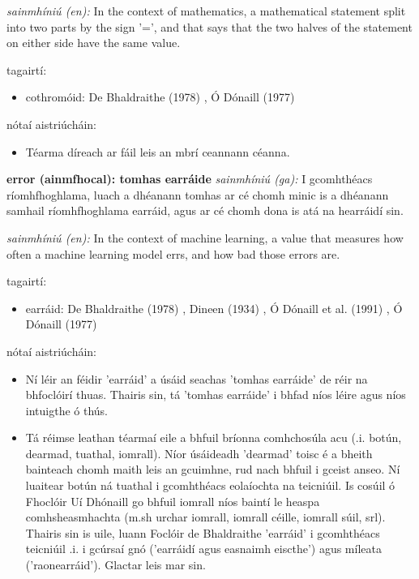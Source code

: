 \documentclass{article}
\begin{document}
\textit{sainmhíniú (en):} In the context of mathematics, a mathematical statement split into two parts by the sign '=', and that says that the two halves of the statement on either side have the same value.

tagairtí:
\begin{itemize}
	\item cothromóid: De Bhaldraithe (1978) \cite{de-bhaldraithe}, Ó Dónaill (1977) \cite{odonaill}
\end{itemize}

nótaí aistriúcháin:
\begin{itemize}
	\item Téarma díreach ar fáil leis an mbrí ceannann céanna.
\end{itemize}


\textbf{error (ainmfhocal): tomhas earráide}
\textit{sainmhíniú (ga):} I gcomhthéacs ríomhfhoghlama, luach a dhéanann tomhas ar cé chomh minic is a dhéanann samhail ríomhfhoghlama earráid, agus ar cé chomh dona is atá na hearráidí sin.

\textit{sainmhíniú (en):} In the context of machine learning, a value that measures how often a machine learning model errs, and how bad those errors are.

tagairtí:
\begin{itemize}
	\item earráid: De Bhaldraithe (1978) \cite{de-bhaldraithe}, Dineen (1934) \cite{dineen}, Ó Dónaill et al. (1991) \cite{focloir-beag}, Ó Dónaill (1977) \cite{odonaill}
\end{itemize}

nótaí aistriúcháin:
\begin{itemize}
	\item Ní léir an féidir 'earráid' a úsáid seachas 'tomhas earráide' de réir na bhfoclóirí thuas. Thairis sin, tá 'tomhas earráide' i bhfad níos léire agus níos intuigthe ó thús.
	\item Tá réimse leathan téarmaí eile a bhfuil bríonna comhchosúla acu (.i. botún, dearmad, tuathal, iomrall). Níor úsáideadh 'dearmad' toisc é a bheith bainteach chomh maith leis an gcuimhne, rud nach bhfuil i gceist anseo. Ní luaitear botún ná tuathal i gcomhthéacs eolaíochta na teicniúil. Is cosúil ó Fhoclóir Uí Dhónaill go bhfuil iomrall níos baintí le  heaspa comhsheasmhachta (m.sh urchar iomrall, iomrall céille, iomrall súil, srl). Thairis sin is uile, luann Foclóir de Bhaldraithe 'earráid' i gcomhthéacs teicniúil .i. i gcúrsaí gnó ('earráidí agus easnaimh eiscthe') agus míleata ('raonearráid'). Glactar leis mar sin.
\end{itemize}
\end{document}
